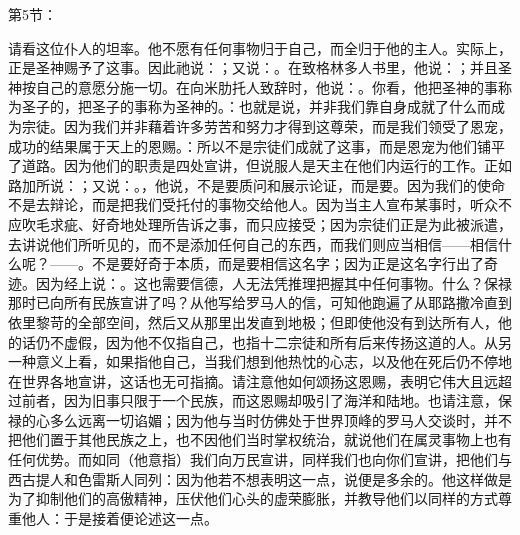 第5节：\par

请看这位仆人的坦率。他不愿有任何事物归于自己，而全归于他的主人。实际上，正是圣神赐予了这事。因此祂说：；又说：。在致格林多人书里，他说：；并且圣神按自己的意愿分施一切。在向米肋托人致辞时，他说：。你看，他把圣神的事称为圣子的，把圣子的事称为圣神的。：也就是说，并非我们靠自身成就了什么而成为宗徒。因为我们并非藉着许多劳苦和努力才得到这尊荣，而是我们领受了恩宠，成功的结果属于天上的恩赐。：所以不是宗徒们成就了这事，而是恩宠为他们铺平了道路。因为他们的职责是四处宣讲，但说服人是天主在他们内运行的工作。正如路加所说：；又说：。，他说，不是要质问和展示论证，而是要。因为我们的使命不是去辩论，而是把我们受托付的事物交给他人。因为当主人宣布某事时，听众不应吹毛求疵、好奇地处理所告诉之事，而只应接受；因为宗徒们正是为此被派遣，去讲说他们所听见的，而不是添加任何自己的东西，而我们则应当相信——相信什么呢？——。不是要好奇于本质，而是要相信这名字；因为正是这名字行出了奇迹。因为经上说：。这也需要信德，人无法凭推理把握其中任何事物。什么？保禄那时已向所有民族宣讲了吗？从他写给罗马人的信，可知他跑遍了从耶路撒冷直到依里黎苛的全部空间，然后又从那里出发直到地极；但即使他没有到达所有人，他的话仍不虚假，因为他不仅指自己，也指十二宗徒和所有后来传扬这道的人。从另一种意义上看，如果指他自己，当我们想到他热忱的心志，以及他在死后仍不停地在世界各地宣讲，这话也无可指摘。请注意他如何颂扬这恩赐，表明它伟大且远超过前者，因为旧事只限于一个民族，而这恩赐却吸引了海洋和陆地。也请注意，保禄的心多么远离一切谄媚；因为他与当时仿佛处于世界顶峰的罗马人交谈时，并不把他们置于其他民族之上，也不因他们当时掌权统治，就说他们在属灵事物上也有任何优势。而如同（他意指）我们向万民宣讲，同样我们也向你们宣讲，把他们与西古提人和色雷斯人同列：因为他若不想表明这一点，说便是多余的。他这样做是为了抑制他们的高傲精神，压伏他们心头的虚荣膨胀，并教导他们以同样的方式尊重他人：于是接着便论述这一点。\par


